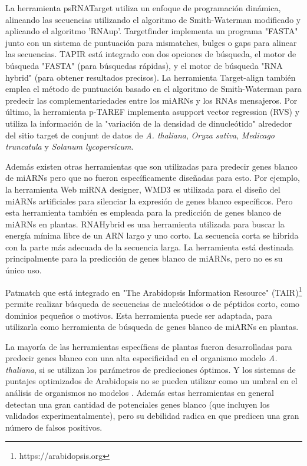 La herramienta psRNATarget \citep{pmid21622958} utiliza un enfoque de programación dinámica, alineando las secuencias utilizando el algoritmo de Smith-Waterman modificado y aplicando el algoritmo 'RNAup'.
Targetfinder \citep{pmid15598838} implementa un programa "FASTA" junto con un sistema de puntuación para mismatches, bulges o gaps para alinear las secuencias.
TAPIR \citep{pmid20430753} está integrado con dos opciones de búsqueda, el motor de búsqueda "FASTA" (para búsquedas rápidas), y el motor de búsqueda "RNA hybrid" (para obtener resultados precisos).
La herramienta Target-align \citep{pmid20934992} también emplea el método de puntuación basado en el algoritmo de Smith-Waterman para predecir las complementariedades entre los miARNs y los RNAs mensajeros.
Por último, la herramienta p-TAREF \citep{pmid22206472} implementa asupport vector regression (RVS) y utiliza la información de la "variación de la densidad de dinucleótido" alrededor del sitio target de conjunt de datos de \textit{A. thaliana}, \textit{Oryza sativa}, \textit{Medicago truncatula} y \textit{Solanum lycopersicum}.

Además existen otras herramientas que son utilizadas para predecir genes blanco de miARNs pero que no fueron específicamente diseñadas para esto.
Por ejemplo, la herramienta  Web miRNA designer, WMD3 \citep{pmid18269576} es utilizada para el diseño del miARNs artificiales para silenciar la expresión de genes blanco específicos.
Pero esta herramienta también es empleada para la predicción de genes blanco de miARNs en plantas.
RNAHybrid \citep{Kruger01072006} es una herramienta utilizada para buscar la energía mínima libre de un ARN largo y uno corto.
La secuencia corta se hibrida con la parte más adecuada de la secuencia larga.
La herramienta está destinada principalmente para la predicción de genes blanco de miARNs, pero no es su único uso.

Patmatch \citep{Yan01072005} que está integrado en "The Arabidopsis Information Resource" (TAIR)\footnote{https://arabidopsis.org} permite realizar búsqueda de secuencias de nucleótidos o de péptidos corto, como dominios pequeños o motivos.
Esta herramienta puede ser adaptada, para utilizarla como herramienta de búsqueda de genes blanco de miARNs en plantas.

La mayoría de las herramientas específicas de plantas fueron desarrolladas para predecir genes blanco con una alta especificidad en el organismo modelo \textit{A. thaliana}, si se utilizan los parámetros de predicciones óptimos.
Y los sistemas de puntajes optimizados de Arabidopsis no se pueden utilizar como un umbral en el análisis de organismos no modelos \citep{pmid24885295}.
Además estas herramientas en general detectan una gran cantidad de potenciales genes blanco (que incluyen los validados experimentalmente), pero su debilidad radica en que predicen una gran número de falsos positivos.

